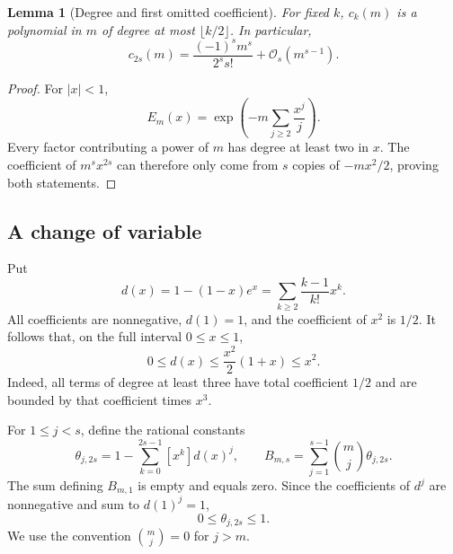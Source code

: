 \documentclass[11pt,a4paper]{article}
\newtheorem{lemma}[theorem]{Lemma}
\theoremstyle{definition}
\newcommand{\bigO}{\mathcal O}
\begin{document}
\begin{lemma}[Degree and first omitted coefficient]\label{lem:degree}
For fixed $k$, $c_k(m)$ is a polynomial in $m$ of degree at most
$\lfloor k/2\rfloor$. In particular,
\begin{equation}\label{eq:leadingc}
 c_{2s}(m)=\frac{(-1)^s m^s}{2^s s!}
             +\bigO_s(m^{s-1}).
\end{equation}
\end{lemma}
\begin{proof}
For $|x|<1$,
\[
 E_m(x)=\exp\left(-m\sum_{j\ge2}\frac{x^j}{j}\right).
\]
Every factor contributing a power of $m$ has degree at least two in $x$.
The coefficient of $m^s x^{2s}$ can therefore only come from $s$ copies of
$-mx^2/2$, proving both statements.
\end{proof}

\subsection{A change of variable}

Put
\begin{equation}\label{eq:d}
 d(x)=1-(1-x)e^x=\sum_{k\ge2}\frac{k-1}{k!}x^k.
\end{equation}
All coefficients are nonnegative, $d(1)=1$, and the coefficient of $x^2$
is $1/2$. It follows that, on the full interval $0\le x\le1$,
\begin{equation}\label{eq:dmajorant}
 0\le d(x)\le\frac{x^2}{2}(1+x)\le x^2.
\end{equation}
Indeed, all terms of degree at least three have total coefficient $1/2$
and are bounded by that coefficient times $x^3$.

For $1\le j<s$, define the rational constants
\begin{equation}\label{eq:theta}
 \theta_{j,2s}
   =1-\sum_{k=0}^{2s-1}[x^k]d(x)^j,
 \qquad
 B_{m,s}=\sum_{j=1}^{s-1}\binom mj\theta_{j,2s}.
\end{equation}
The sum defining $B_{m,1}$ is empty and equals zero. Since the
coefficients of $d^j$ are nonnegative and sum to $d(1)^j=1$,
\begin{equation}\label{eq:theta01}
 0\le\theta_{j,2s}\le1.
\end{equation}
We use the convention $\binom mj=0$ for $j>m$.
\end{document}
